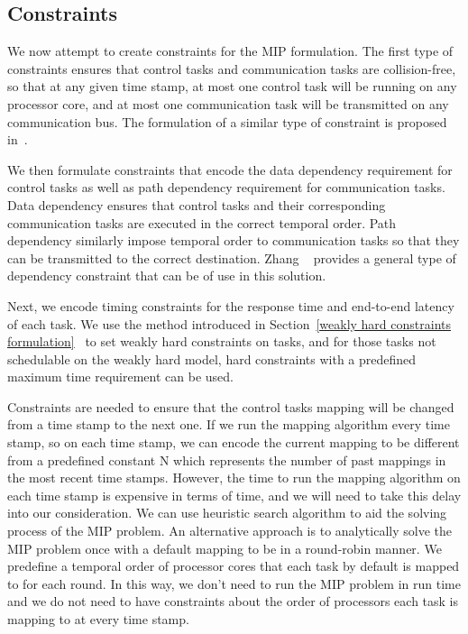 \subsection{Constraints}
We now attempt to create constraints for the MIP formulation. The first type of constraints ensures that control tasks and communication tasks are collision-free, so that at any given time stamp, at most one control task will be running on any processor core, and at most one communication task will be transmitted on any communication bus. The formulation of a similar type of constraint is proposed in~\cite{Zhang2018SynthesizingCA}.

We then formulate constraints that encode the data dependency requirement for control tasks as well as path dependency requirement for communication tasks. Data dependency ensures that control tasks and their corresponding communication tasks are executed in the correct temporal order. Path dependency similarly impose temporal order to communication tasks so that they can be transmitted to the correct destination. Zhang ~\cite{Zhang2018SynthesizingCA} provides a general type of dependency constraint that can be of use in this solution.

Next, we encode timing constraints for the response time and end-to-end latency of each task. We use the method introduced in Section~\ref{weakly hard constraints formulation}~\cite{liang2019security} to set weakly hard constraints on tasks, and for those tasks not schedulable on the weakly hard model, hard constraints with a predefined maximum time requirement can be used.

Constraints are needed to ensure that the control tasks mapping will be changed from a time stamp to the next one. If we run the mapping algorithm every time stamp, so on each time stamp, we can encode the current mapping to be different from a predefined constant N which represents the number of past mappings in the most recent time stamps. However, the time to run the mapping algorithm on each time stamp is expensive in terms of time, and we will need to take this delay into our consideration. We can use heuristic search algorithm to aid the solving process of the MIP problem. An alternative approach is to analytically solve the MIP problem once with a default mapping to be in a round-robin manner. We predefine a temporal order of processor cores that each task by default is mapped to for each round. In this way, we don't need to run the MIP problem in run time and we do not need to have constraints about the order of processors each task is mapping to at every time stamp.

















